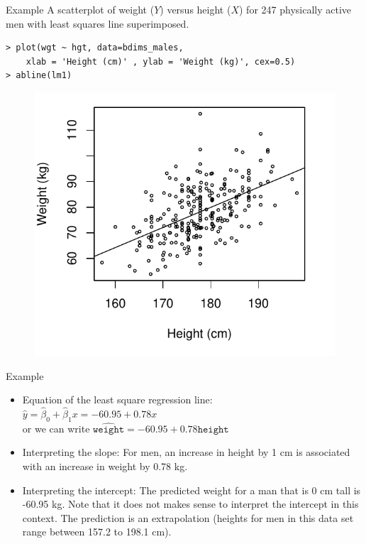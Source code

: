 \documentclass[10pt]{beamer}
\begin{document}
\begin{frame}[fragile]{Example}
A scatterplot of weight ($Y$) versus height ($X$) for 247 physically active men with least squares line superimposed.
\small
\begin{verbatim}
> plot(wgt ~ hgt, data=bdims_males, 
    xlab = 'Height (cm)' , ylab = 'Weight (kg)', cex=0.5)
> abline(lm1)
\end{verbatim}
\begin{figure}[htbp]
\centering
\includegraphics[scale=0.5]{figure/wgt_hgt_plot2.pdf}
\end{figure}
\end{frame}

\begin{frame}{Example}
\begin{itemize}
\item Equation of the least square regression line:\\
$\hat{y} = \hat{\beta}_0 + \hat{\beta}_1 x = -60.95 + 0.78 x$\\ 
or we can write $\widehat{\texttt{weight}} = -60.95 + 0.78 \texttt{height}$
\vspace{5pt}
\item Interpreting the slope: For men, an increase in height by 1 cm is associated with an increase in weight by 0.78 kg.
\vspace{5pt}
\item Interpreting the intercept:  The predicted weight for a man that is 0 cm tall is -60.95 kg.  Note that it does not makes sense to interpret the intercept in this context.  The prediction is an extrapolation (heights for men in this data set range between 157.2 to 198.1 cm).
\end{itemize}
\end{frame}
\end{document}
